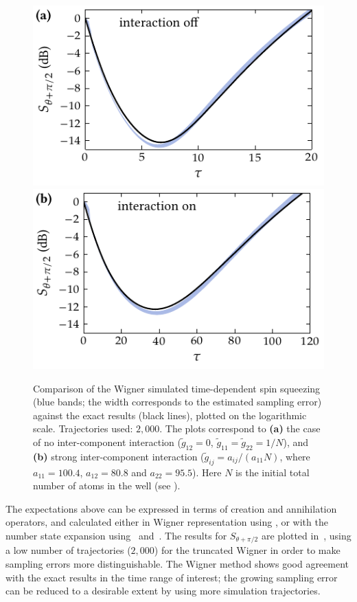\begin{figure}
    \centerline{%
    \includegraphics{figures_generated/exact/squeezing_nocc_100.pdf}%
    \includegraphics{figures_generated/exact/squeezing_cc_100.pdf}}

    \caption[Comparison of Wigner simulated spin squeezing with an exact method]{
    Comparison of the Wigner simulated time-dependent spin squeezing (blue bands; the width corresponds to the estimated sampling error) against the exact results (black lines), plotted on the logarithmic scale.
    Trajectories used: $2,000$.
    The plots correspond to \textbf{(a)} the case of no inter-component interaction ($\tilde{g}_{12} = 0$, $\tilde{g}_{11} = \tilde{g}_{22} = 1 / N$), and \textbf{(b)} strong inter-component interaction ($\tilde{g}_{ij} = a_{ij} / (a_{11} N)$, where $a_{11} = 100.4$, $a_{12} = 80.8$ and $a_{22} = 95.5$).
    Here $N$ is the initial total number of atoms in the well (see ).}%

    \label{fig:exact:squeezing-comparison}
\end{figure}

The expectations above can be expressed in terms of creation and annihilation operators, and calculated either in Wigner representation using , or with the number state expansion using~ and~.
The results for $S_{\theta+\pi/2}$ are plotted in~, using a low number of trajectories ($2,000$) for the truncated Wigner in order to make sampling errors more distinguishable.
The Wigner method shows good agreement with the exact results in the time range of interest; the growing sampling error can be reduced to a desirable extent by using more simulation trajectories.

